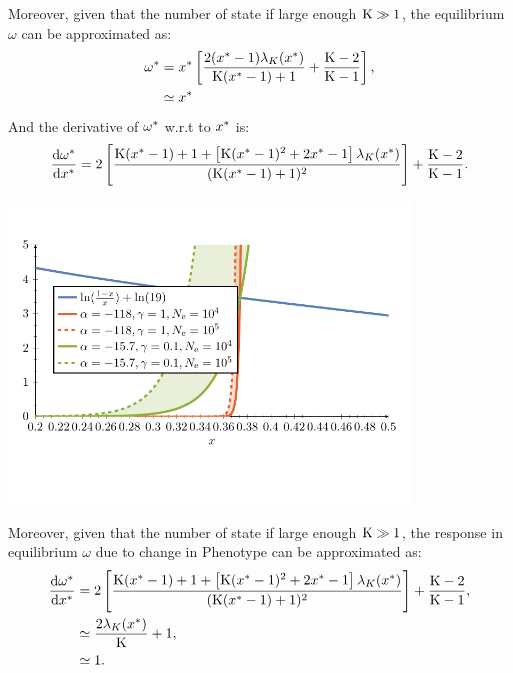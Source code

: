 Moreover, given that the number of state if large enough $\text{K} \gg 1$, the equilibrium $\omega$ can be approximated as:
\begin{align}
\omega^{*}  & = x^{*} \left[ \frac{2 (x^{*}-1)  \lambda_{K}(x^{*}) }{\text{K} (x^{*}-1)+1} + \frac{\text{K} - 2}{\text{K} - 1}\right], \\
& \simeq x^{*}
\end{align}
And the derivative of $\omega^{*}$ w.r.t to $x^{*}$ is: 
\begin{gather}
\frac{\mathrm{d} \omega^{*}}{\mathrm{d} x^{*}} = 2 \left[ \frac{\text{K} (x^{*}- 1) + 1+\left[\text{K} (x^{*}-1)^2+2 x^{*}-1\right] \lambda_{K}(x^{*}) }{(\text{K} (x^{*}-1)+1)^2}\right] + \frac{\text{K} - 2}{\text{K} - 1} \label{eq:dw_dx}.
\end{gather}
\begin{center}
 \includegraphics[width=0.8\textwidth, page=3] {analytical-relaxation}
\end{center}
Moreover, given that the number of state if large enough $\text{K} \gg 1$, the response in equilibrium $\omega$ due to change in \gls{Phenotype} can be approximated as:
\begin{align}
\frac{ \mathrm{d} \omega^{*}}{\mathrm{d} x^{*}}  & = 2 \left[ \frac{\text{K} (x^{*}- 1) + 1+\left[\text{K} (x^{*}-1)^2+2 x^{*}-1\right] \lambda_{K}(x^{*}) }{(\text{K} (x^{*}-1)+1)^2}\right] + \frac{\text{K} - 2}{\text{K} - 1}, \\
& \simeq \frac{2 \lambda_{K}(x^{*})}{\text{K}} + 1, \\
& \simeq 1. \label{eq:approx_domega_dx}
\end{align}

